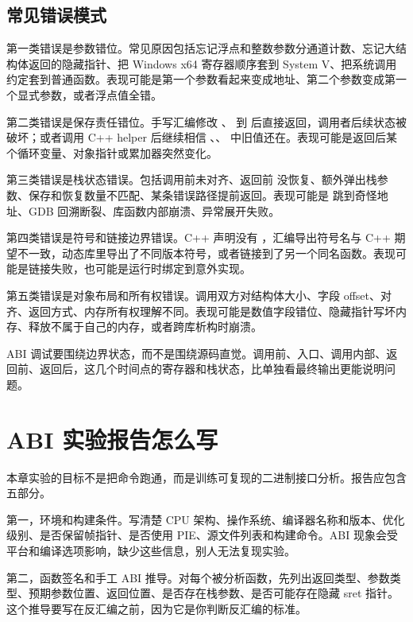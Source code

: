\subsection{常见错误模式}

第一类错误是参数错位。常见原因包括忘记浮点和整数参数分通道计数、忘记大结构体返回的隐藏指针、把 Windows x64 寄存器顺序套到 System V、把系统调用约定套到普通函数。表现可能是第一个参数看起来变成地址、第二个参数变成第一个显式参数，或者浮点值全错。

第二类错误是保存责任错位。手写汇编修改 、 到  后直接返回，调用者后续状态被破坏；或者调用 C++ helper 后继续相信 、、 中旧值还在。表现可能是返回后某个循环变量、对象指针或累加器突然变化。

第三类错误是栈状态错误。包括调用前未对齐、返回前  没恢复、额外弹出栈参数、保存和恢复数量不匹配、某条错误路径提前返回。表现可能是  跳到奇怪地址、GDB 回溯断裂、库函数内部崩溃、异常展开失败。

第四类错误是符号和链接边界错误。C++ 声明没有 ，汇编导出符号名与 C++ 期望不一致，动态库里导出了不同版本符号，或者链接到了另一个同名函数。表现可能是链接失败，也可能是运行时绑定到意外实现。

第五类错误是对象布局和所有权错误。调用双方对结构体大小、字段 offset、对齐、返回方式、内存所有权理解不同。表现可能是数值字段错位、隐藏指针写坏内存、释放不属于自己的内存，或者跨库析构时崩溃。

\begin{keyidea}
ABI 调试要围绕边界状态，而不是围绕源码直觉。调用前、入口、调用内部、返回前、返回后，这几个时间点的寄存器和栈状态，比单独看最终输出更能说明问题。
\end{keyidea}

\section{ABI 实验报告怎么写}

本章实验的目标不是把命令跑通，而是训练可复现的二进制接口分析。报告应包含五部分。

第一，环境和构建条件。写清楚 CPU 架构、操作系统、编译器名称和版本、优化级别、是否保留帧指针、是否使用 PIE、源文件列表和构建命令。ABI 现象会受平台和编译选项影响，缺少这些信息，别人无法复现实验。

第二，函数签名和手工 ABI 推导。对每个被分析函数，先列出返回类型、参数类型、预期参数位置、返回位置、是否存在栈参数、是否可能存在隐藏 sret 指针。这个推导要写在反汇编之前，因为它是你判断反汇编的标准。

